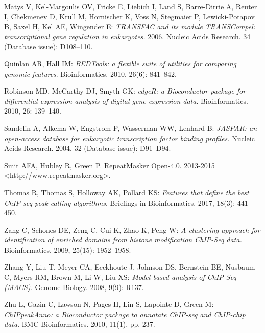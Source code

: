 \documentclass[12pt]{article}
\begin{document}
\begin{thebibliography}{31}
Matys V, Kel-Margoulis OV, Fricke E, Liebich I, Land S, Barre-Dirrie A, Reuter I, Chekmenev D, Krull M, Hornischer K, Voss N, Stegmaier P, Lewicki-Potapov B, Saxel H, Kel AE, Wingender E:  \textit{TRANSFAC and its module TRANSCompel: transcriptional gene regulation in eukaryotes.}  2006.  Nucleic Acids Research.  34 (Database issue): D108--110.

Quinlan AR, Hall IM: \textit{BEDTools: a flexible suite of utilities for comparing genomic features}. Bioinformatics. 2010, 26(6): 841--842.

Robinson MD, McCarthy DJ, Smyth GK: \textit{edgeR: a Bioconductor package for differential expression analysis of digital gene expression data}. Bioinformatics. 2010, 26: 139--140.

Sandelin A, Alkema W, Engstrom P, Wasserman WW, Lenhard B:  \textit{JASPAR: an open-access database for eukaryotic transcription factor binding profiles.}  Nucleic Acids Research.  2004, 32 (Database issue): D91--D94.  

Smit AFA, Hubley R, Green P. RepeatMasker Open-4.0.  2013-2015  \url{<http://www.repeatmasker.org>}.

Thomas R, Thomas S, Holloway AK, Pollard KS: \textit{Features that define the best ChIP-seq peak calling algorithms}.  Briefings in Bioinformatics.  2017, 18(3): 441--450.

Zang C, Schones DE, Zeng C, Cui K, Zhao K, Peng W:  \textit{A clustering approach for identification of enriched domains from histone modification ChIP-Seq data.}  Bioinformatics.  2009, 25(15): 1952--1958.

Zhang Y, Liu T, Meyer CA, Eeckhoute J, Johnson DS, Bernstein BE, Nusbaum C, Myers RM, Brown M, Li W, Liu XS:  \textit{Model-based analysis of ChIP-Seq (MACS).}  Genome Biology.  2008, 9(9): R137.

Zhu L, Gazin C, Lawson N, Pages H, Lin S, Lapointe D, Green M: \textit{ChIPpeakAnno: a Bioconductor package to annotate ChIP-seq and ChIP-chip data}.  BMC Bioinformatics.  2010, 11(1), pp. 237.

\end{thebibliography}
\end{document}
